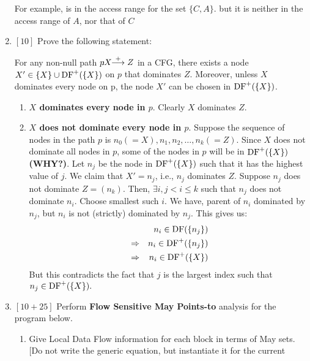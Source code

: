\documentclass[12pt]{article}
\newcommand{\answer}[1]{{{\blue #1}}}
\begin{document}
\begin{enumerate}
{{
For example,  is in the access range for the set $\{C, A\}$. but it is neither in the access range of $A$, nor that of $C$
}}

\answer{\clearpage}
\item $[10]$ Prove the following statement:

  For any non-null path $p\!\!\!:\!\! X\!\!\stackrel{+}{\longrightarrow} Z$ in a CFG, there exists a node \linebreak
  $X' \in \{X\} \cup \mbox{DF}^+(\{X\})$ on $p$ that dominates
  $Z$. Moreover, unless $X$ dominates every node on p, the node
  $X'$ can be chosen in $\mbox{DF}^+(\{X\})$.

\answer{
  \begin{enumerate}
  \item {\bf $X$ dominates every node in $p$}. Clearly $X$
    dominates $Z$.
  \item {\bf $X$ does not dominate every node in $p$}. Suppose the sequence of nodes in the path $p$ is $n_0 (=X), n_1, n_2, \ldots, n_k (=Z)$. Since $X$ does not dominate all nodes in $p$, some of the nodes in $p$ will be in $\mbox{DF}^+(\{X\})$ {\bf (WHY?)}. Let $n_j$ be the node in $\mbox{DF}^+(\{X\})$ such that it has the highest value of $j$. We claim that $X' = n_j$, i.e., $n_j$ dominates $Z$.
  Suppose $n_j$ does not dominate $Z = (n_k)$. Then, $\exists i, j < i \leq k$ such that $n_j$ does not dominate $n_i$. Choose smallest such $i$. We have, parent of $n_i$ dominated by $n_j$, but $n_i$ is not (strictly) dominated by $n_j$. This gives us:
  \begin{eqnarray*}
    &&n_i \in \mbox{DF}(\{n_j\})\\
       &\Rightarrow& n_i \in \mbox{DF}^+(\{n_j\})\\
       &\Rightarrow& n_i \in \mbox{DF}^+(\{X\})
  \end{eqnarray*}
But this contradicts the fact that $j$ is the largest index such that $n_j \in \mbox{DF}^+(\{X\}).$
  \end{enumerate}
}
\answer{\clearpage}
\item $[10 + 25]$ Perform {\bf Flow Sensitive May Points-to}
  analysis for the program below. 
  \begin{enumerate}
  \item Give Local Data Flow information for each block
    in terms of May sets. [Do not write the
      generic equation, but instantiate it for the current

\end{enumerate}
\end{enumerate}
\end{document}
